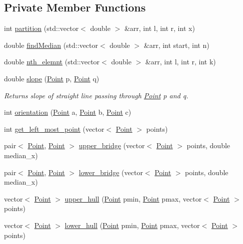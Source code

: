 \subsection*{Private Member Functions}
\begin{DoxyCompactItemize}
\item 
int \hyperlink{classConvexHull_a40a096aa99d63b40043cebf56b9049d1}{partition} (std\+::vector$<$ double $>$ \&arr, int l, int r, int x)
\item 
double \hyperlink{classConvexHull_ae9a05f0c2c429d5cbac387848c5d838a}{find\+Median} (std\+::vector$<$ double $>$ \&arr, int start, int n)
\item 
double \hyperlink{classConvexHull_a582497a1ae56330653d543a2a17b7ccf}{nth\+\_\+elemnt} (std\+::vector$<$ double $>$ \&arr, int l, int r, int k)
\item 
\mbox{\label{classConvexHull_aedc984e25f85f9fe3d24f6d5ce3e88ed}} 
double \hyperlink{classConvexHull_aedc984e25f85f9fe3d24f6d5ce3e88ed}{slope} (\hyperlink{classPoint}{Point} p, \hyperlink{classPoint}{Point} q)
\begin{DoxyCompactList}\small\item\em Returns slope of straight line passing through \hyperlink{classPoint}{Point} \textquotesingle{}p\textquotesingle{} and \textquotesingle{}q\textquotesingle{}. \end{DoxyCompactList}\item 
int \hyperlink{classConvexHull_a0ae8784263b86fd85bfb2c545b2e61d5}{orientation} (\hyperlink{classPoint}{Point} a, \hyperlink{classPoint}{Point} b, \hyperlink{classPoint}{Point} c)
\item 
int \hyperlink{classConvexHull_ac074c3d6e238d203baa62c0da7b5c7b2}{get\+\_\+left\+\_\+most\+\_\+point} (vector$<$ \hyperlink{classPoint}{Point} $>$ points)
\item 
pair$<$ \hyperlink{classPoint}{Point}, \hyperlink{classPoint}{Point} $>$ \hyperlink{classConvexHull_a7efe590d1b83a1459dc4ccae4e59bf5b}{upper\+\_\+bridge} (vector$<$ \hyperlink{classPoint}{Point} $>$ points, double median\+\_\+x)
\item 
pair$<$ \hyperlink{classPoint}{Point}, \hyperlink{classPoint}{Point} $>$ \hyperlink{classConvexHull_a8e3d1304a5aa148d020a279db93ac65e}{lower\+\_\+bridge} (vector$<$ \hyperlink{classPoint}{Point} $>$ points, double median\+\_\+x)
\item 
vector$<$ \hyperlink{classPoint}{Point} $>$ \hyperlink{classConvexHull_a9c8c6225b24b35b43c9d7dea05b76023}{upper\+\_\+hull} (\hyperlink{classPoint}{Point} pmin, \hyperlink{classPoint}{Point} pmax, vector$<$ \hyperlink{classPoint}{Point} $>$ points)
\item 
vector$<$ \hyperlink{classPoint}{Point} $>$ \hyperlink{classConvexHull_a2fd80a61b1996d7f58ce071fc7a5e33c}{lower\+\_\+hull} (\hyperlink{classPoint}{Point} pmin, \hyperlink{classPoint}{Point} pmax, vector$<$ \hyperlink{classPoint}{Point} $>$ points)
\end{DoxyCompactItemize}
